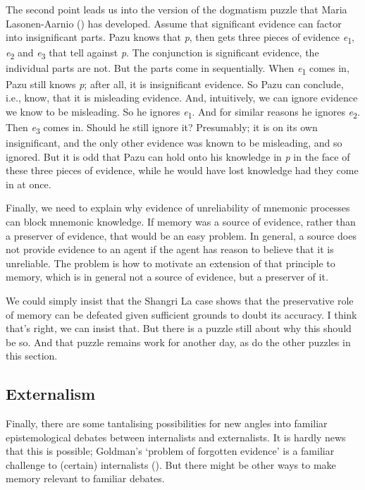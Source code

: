\documentclass[
  10pt,
  letterpaper,
  DIV=11,
  numbers=noendperiod,
  twoside]{scrartcl}
\begin{document}
The second point leads us into the version of the dogmatism puzzle that
Maria Lasonen-Aarnio () has
developed. Assume that significant evidence can factor into
insignificant parts. Pazu knows that \emph{p}, then gets three pieces of
evidence \emph{e}\textsubscript{1}, \emph{e}\textsubscript{2} and
\emph{e}\textsubscript{3} that tell against \emph{p}. The conjunction is
significant evidence, the individual parts are not. But the parts come
in sequentially. When \emph{e}\textsubscript{1} comes in, Pazu still
knows \emph{p}; after all, it is insignificant evidence. So Pazu can
conclude, i.e., know, that it is misleading evidence. And, intuitively,
we can ignore evidence we know to be misleading. So he ignores
\emph{e}\textsubscript{1}. And for similar reasons he ignores
\emph{e}\textsubscript{2}. Then \emph{e}\textsubscript{3} comes in.
Should he still ignore it? Presumably; it is on its own insignificant,
and the only other evidence was known to be misleading, and so ignored.
But it is odd that Pazu can hold onto his knowledge in \emph{p} in the
face of these three pieces of evidence, while he would have lost
knowledge had they come in at once.

Finally, we need to explain why evidence of unreliability of mnemonic
processes can block mnemonic knowledge. If memory was a source of
evidence, rather than a preserver of evidence, that would be an easy
problem. In general, a source does not provide evidence to an agent if
the agent has reason to believe that it is unreliable. The problem is
how to motivate an extension of that principle to memory, which is in
general not a source of evidence, but a preserver of it.

We could simply insist that the Shangri La case shows that the
preservative role of memory can be defeated given sufficient grounds to
doubt its accuracy. I think that's right, we can insist that. But there
is a puzzle still about why this should be so. And that puzzle remains
work for another day, as do the other puzzles in this section.

\subsection{Externalism}\label{externalism}

Finally, there are some tantalising possibilities for new angles into
familiar epistemological debates between internalists and externalists.
It is hardly news that this is possible; Goldman's `problem of forgotten
evidence' is a familiar challenge to (certain) internalists
(). But there might be other
ways to make memory relevant to familiar debates.
\end{document}

